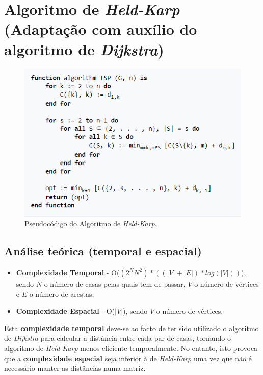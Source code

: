 \documentclass[article, a4paper, 12pt, oneside]{memoir}
\begin{document}
\section{Algoritmo de \textit{Held-Karp} (Adaptação com auxílio do algoritmo de \textit{Dijkstra})}

\begin{figure}[h!]
  \centerline{\includegraphics[scale=1]{Held-Karp Algorithm.PNG}}
  \caption{Pseudocódigo do Algoritmo de \textit{Held-Karp}.}
\end{figure}

\subsection{Análise teórica (temporal e espacial)}

\begin{itemize}
	\item \textbf{Complexidade Temporal} -  O($(2^N N^2)*((|V| + |E|)*log(|V|))$), sendo $N$ o número de casas pelas quais tem de passar, $V$ o número de vértices e $E$ o número de arestas;
	\item \textbf{Complexidade Espacial} - O($|V|$), sendo $V$ o número de vértices.
\end{itemize}

Esta \textbf{complexidade temporal} deve-se ao facto de ter sido utilizado o algoritmo de \textit{Dijkstra} para calcular a distância entre cada par de casas, tornando o algoritmo de \textit{Held-Karp} menos eficiente temporalmente. No entanto, isto provoca que a \textbf{complexidade espacial} seja inferior à de \textit{Held-Karp} uma vez que não é necessário manter as distâncias numa matriz.
\end{document}
